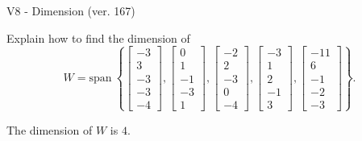 \begin{exercise}
  \begin{exerciseTitle}V8 - Dimension (ver. 167)\end{exerciseTitle}
  \begin{exerciseStatement}
    Explain how to find the dimension of 
\[W=\mathrm{span}\ \left\{\left[\begin{array}{r}
-3 \\
3 \\
-3 \\
-3 \\
-4
\end{array}\right] , \left[\begin{array}{r}
0 \\
1 \\
-1 \\
-3 \\
1
\end{array}\right] , \left[\begin{array}{r}
-2 \\
2 \\
-3 \\
0 \\
-4
\end{array}\right] , \left[\begin{array}{r}
-3 \\
1 \\
2 \\
-1 \\
3
\end{array}\right] , \left[\begin{array}{r}
-11 \\
6 \\
-1 \\
-2 \\
-3
\end{array}\right]\right\}.\]



  \end{exerciseStatement}
  \begin{exerciseAnswer}
   The dimension of \(W\) is  \(4\).
  


  \end{exerciseAnswer}
\end{exercise}